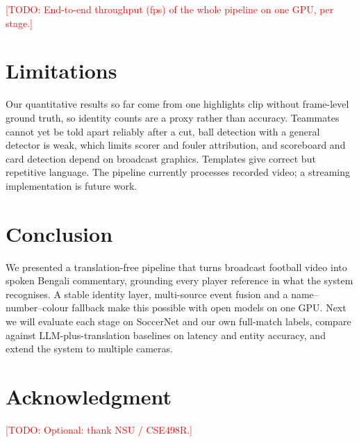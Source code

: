 \documentclass[conference]{IEEEtran}
\newcommand{\todo}[1]{\textcolor{red}{[TODO: #1]}}
\begin{document}
\todo{End-to-end throughput (fps) of the whole pipeline on one GPU, per stage.}

\section{Limitations}
Our quantitative results so far come from one highlights clip without frame-level ground truth, so identity counts are a proxy rather than accuracy. Teammates cannot yet be told apart reliably after a cut, ball detection with a general detector is weak, which limits scorer and fouler attribution, and scoreboard and card detection depend on broadcast graphics. Templates give correct but repetitive language. The pipeline currently processes recorded video; a streaming implementation is future work.

\section{Conclusion}
We presented a translation-free pipeline that turns broadcast football video into spoken Bengali commentary, grounding every player reference in what the system recognises. A stable identity layer, multi-source event fusion and a name--number--colour fallback make this possible with open models on one GPU. Next we will evaluate each stage on SoccerNet and our own full-match labels, compare against LLM-plus-translation baselines on latency and entity accuracy, and extend the system to multiple cameras.

\section*{Acknowledgment}
\todo{Optional: thank NSU / CSE498R.}



\end{document}
